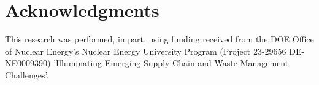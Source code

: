 \documentclass{anstrans}
\begin{document}


\appendix


\section{Acknowledgments}
This research was performed, in part, using funding received from the DOE
Office of Nuclear Energy's Nuclear Energy University Program (Project 23-29656
DE-NE0009390) 'Illuminating Emerging Supply Chain and Waste Management
Challenges'.



\end{document}

